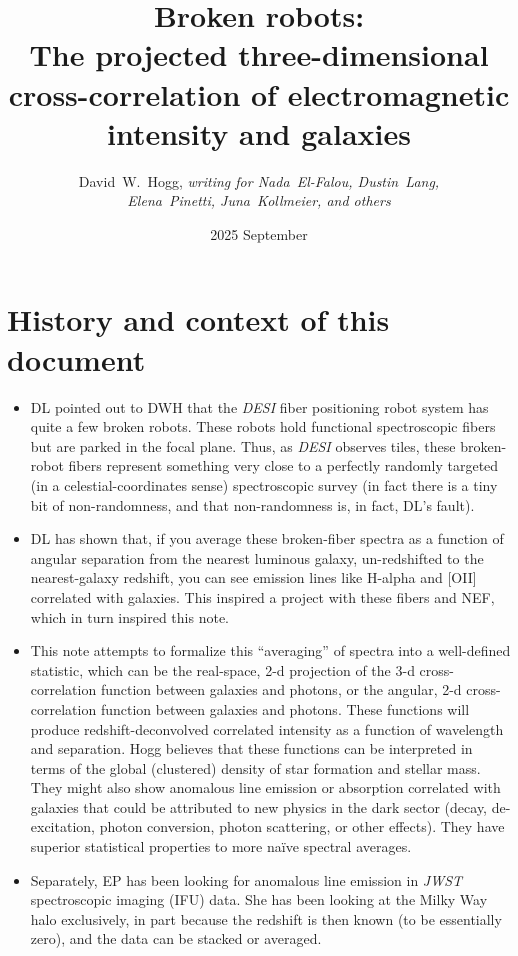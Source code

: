 \documentclass{article}
\title{\bfseries%
Broken robots:\\
The projected three-dimensional cross-correlation of electromagnetic intensity and galaxies}
\author{David~W.~Hogg, {\itshape writing for Nada~El-Falou, Dustin~Lang,} \\ {\itshape Elena~Pinetti, Juna~Kollmeier, and others}}
\date{2025 September}
\newcommand{\project}[1]{\textsl{#1}}
\begin{document}
\maketitle

\section*{History and context of this document}
\begin{itemize}
\item DL pointed out to DWH that the \project{DESI} fiber positioning robot system has quite a few broken robots.
  These robots hold functional spectroscopic fibers but are parked in the focal plane.
  Thus, as \project{DESI} observes tiles, these broken-robot fibers represent something very close to a perfectly randomly targeted (in a celestial-coordinates sense) spectroscopic survey (in fact there is a tiny bit of non-randomness, and that non-randomness is, in fact, DL's fault).
\item DL has shown that, if you average these broken-fiber spectra as a function of angular separation from the nearest luminous galaxy, un-redshifted to the nearest-galaxy redshift, you can see emission lines like H-alpha and [OII] correlated with galaxies.
  This inspired a project with these fibers and NEF, which in turn inspired this note.
\item
  This note attempts to formalize this ``averaging'' of spectra into a well-defined statistic, which can be the real-space, 2-d projection of the 3-d cross-correlation function between galaxies and photons, or the angular, 2-d cross-correlation function between galaxies and photons.
  These functions will produce redshift-deconvolved correlated intensity as a function of wavelength and separation.
  Hogg believes that these functions can be interpreted in terms of the global (clustered) density of star formation and stellar mass.
  They might also show anomalous line emission or absorption correlated with galaxies that could be attributed to new physics in the dark sector (decay, de-excitation, photon conversion, photon scattering, or other effects).
  They have superior statistical properties to more na\"ive spectral averages.
\item Separately, EP has been looking for anomalous line emission in \project{JWST} spectroscopic imaging (IFU) data.
  She has been looking at the Milky Way halo exclusively, in part because the redshift is then known (to be essentially zero), and the data can be stacked or averaged.

\end{itemize}
\end{document}

